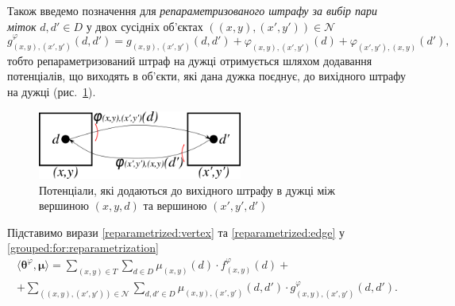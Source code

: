 Також введемо позначення для
\textit{репараметризованого штрафу за вибір пари міток}
$d, d' \in D$ у двох сусідніх об'єктах
$\left( \left(x, y \right), \left(x', y'\right) \right) \in \mathcal{N}$
\begin{equation} \label{reparametrized:edge}
    g_{\left(x, y \right), \left(x', y'\right)}^{\varphi} \left(d, d' \right) =
    g_{\left(x, y \right), \left(x', y' \right)} \left(d, d' \right) +
    \varphi_{\left(x, y \right), \left(x', y' \right)} \left( d \right) +
    \varphi_{\left(x', y' \right), \left(x, y \right)} \left( d' \right),
\end{equation}
тобто репараметризований
штраф на дужці отримується шляхом додавання потенціалів,
що виходять в об'єкти, які дана дужка поєднує, до вихідного штрафу на дужці
(рис.~\ref{fig:reparametrized:edge:weight}).

\begin{figure}[h]
  \centering
  \includegraphics[width=0.6\textwidth]{images/reparametrized_edge_weight}
  \caption{Потенціали, які додаються до вихідного штрафу в дужці між вершиною
           $\left(x, y, d \right)$ та вершиною $\left(x', y', d' \right)$}
  \label{fig:reparametrized:edge:weight}
\end{figure}

Підставимо вирази \eqref{reparametrized:vertex} та \eqref{reparametrized:edge}
у \eqref{grouped:for:reparametrization}
\begin{equation*}
\begin{gathered}
    \langle \pmb{\theta}^{\varphi}, \pmb{\mu} \rangle =
    \sum \limits_{\left(x, y \right) \in T}
        \sum \limits_{d \in D}
            \mu_{\left(x, y \right)} \left(d \right) \cdot
            f_{\left(x, y \right)}^{\varphi} \left(d \right) + \\
    + \sum \limits_{\left(\left(x, y \right), \left(x', y' \right)\right)\in \mathcal{N}}
        \sum \limits_{d, d' \in D}
            \mu_{\left(x, y \right), \left(x', y' \right)} \left(d, d' \right)
            \cdot g_{\left(x, y \right), \left(x', y'\right)}^{\varphi} \left(
                d, d'
            \right).
\end{gathered}
\end{equation*}

